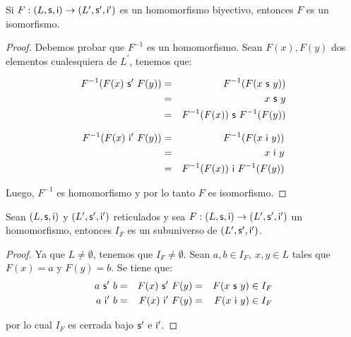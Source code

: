   \begin{lemma} \label{lemma_5}
    \PN Si $F: (L, \mathsf{s}, \mathsf{i}) \rightarrow (L^{\prime}, \mathsf{s}^{\prime}, \mathsf{i}^{\prime})$ es un homomorfismo biyectivo, entonces $F$ es un isomorfismo.
  \end{lemma}
  \begin{proof}
    \PN Debemos probar que $F^{-1}$ es un homomorfismo. Sean $F(x), F(y)$ dos elementos cualesquiera de $L^{\prime}$,
    tenemos que:
    \begin{multicols}{2}
      \begin{eqnarray*}
        F^{-1}(F(x) \ \mathsf{s}^{\prime} \ F(y)) &=& F^{-1}(F(x \ \mathsf{s} \ y)) \\
        &=& x \ \mathsf{s} \ y \\
        &=& F^{-1}(F(x)) \ \mathsf{s} \ F^{-1}(F(y))
      \end{eqnarray*}

      \begin{eqnarray*}
        F^{-1}(F(x) \ \mathsf{i}^{\prime} \ F(y)) &=& F^{-1}(F(x \ \mathsf{i} \ y)) \\
        &=& x \ \mathsf{i} \ y \\
        &=& F^{-1}(F(x)) \ \mathsf{i} \ F^{-1}(F(y))
      \end{eqnarray*}
    \end{multicols}

    \PN Luego, $F^{-1}$ es homomorfismo y por lo tanto $F$ es isomorfismo.
  \end{proof}

  \begin{lemma} \label{lemma_6}
    \PN Sean $(L, \mathsf{s}, \mathsf{i})$ y $(L^{\prime}, \mathsf{s}^{\prime}, \mathsf{i}^{\prime})$ reticulados y sea $F: (L, \mathsf{s}, \mathsf{i}) \rightarrow (L^{\prime}, \mathsf{s}^{\prime}, \mathsf{i}^{\prime})$ un homomorfismo, entonces $I_{F}$ es
    un subuniverso de $(L^{\prime}, \mathsf{s}^{\prime}, \mathsf{i}^{\prime})$.
  \end{lemma}
  \begin{proof}
    \PN Ya que $L \neq \emptyset$, tenemos que $I_{F} \neq \emptyset$. Sean $a, b \in I_{F}, \ x, y \in L$ tales que
    $F(x) = a$ y $F(y) = b$. Se tiene que:
    \begin{alignat*}{3}
      a \ \SU^{\prime} \ b &=& F(x) \ \SU^{\prime} \ F(y) &=& F(x \ \SU \ y) \in I_{F} \\
      a \ \IN^{\prime} \ b &=& F(x) \ \IN^{\prime} \ F(y) &=& F(x \ \IN \ y) \in I_{F}
    \end{alignat*}

    \PN por lo cual $I_{F}$ es cerrada bajo $\mathsf{s}^{\prime}$ e $\mathsf{i}^{\prime}$.
  \end{proof}

